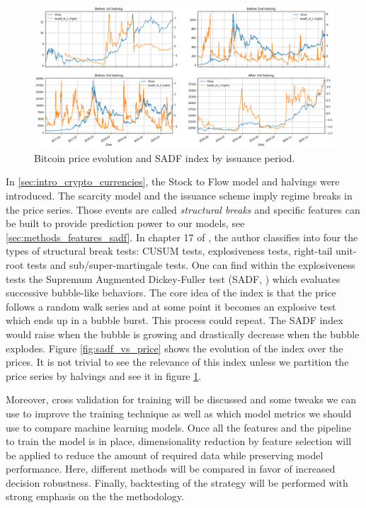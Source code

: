 \begin{figure}[!htb]
    \centering
    \includegraphics[width=\textwidth]{introduction/images/sadf_per_period.png}
    \caption{Bitcoin price evolution and SADF index by issuance period.}
    \label{fig:sadf_by_halving}
\end{figure}

In \ref{sec:intro_crypto_currencies}, the Stock to Flow model and halvings were introduced. The scarcity model and the issuance scheme imply regime breaks in the price series. Those events are called \emph{structural breaks} and specific features can be built to provide prediction power to our models, see \ref{sec:methods_features_sadf}. In chapter 17 of \cite{lopez_de_prado}, the author classifies into four the types of structural break tests: CUSUM tests, explosiveness tests, right-tail unit-root tests and sub/super-martingale tests. One can find within the explosiveness tests the Supremum Augmented Dickey-Fuller test (SADF, \cite{sadf_paper}) which evaluates successive bubble-like behaviors. The core idea of the index is that the price follows a random walk series and at some point it becomes an explosive test which ends up in a bubble burst. This process could repeat. The SADF index would raise when the bubble is growing and drastically decrease when the bubble explodes. Figure \ref{fig:sadf_vs_price} shows the evolution of the index over the prices. It is not trivial to see the relevance of this index unless we partition the price series by halvings and see it in figure \ref{fig:sadf_by_halving}.


Moreover, cross validation for training will be discussed and some tweaks we can use to improve the training technique as well as which model metrics we should use to compare machine learning models. Once all the features and the pipeline to train the model is in place, dimensionality reduction by feature selection will be applied to reduce the amount of required data while preserving model performance. Here, different methods will be compared in favor of increased decision robustness. Finally, backtesting of the strategy will be performed with strong emphasis on the the methodology.
